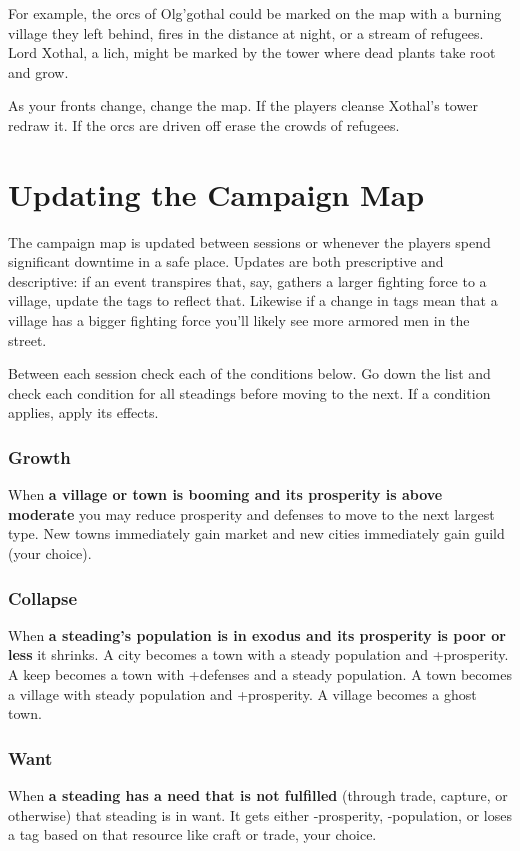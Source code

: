  For example, the orcs of Olg'gothal could be marked on the map with a burning village they left behind, fires in the distance at night, or a stream of refugees. Lord Xothal, a lich, might be marked by the tower where dead plants take root and grow.


 As your fronts change, change the map. If the players cleanse Xothal's tower redraw it. If the orcs are driven off erase the crowds of refugees.
\section*{Updating the Campaign Map}


 The campaign map is updated between sessions or whenever the players spend significant downtime in a safe place. Updates are both prescriptive and descriptive: if an event transpires that, say, gathers a larger fighting force to a village, update the tags to reflect that. Likewise if a change in tags mean that a village has a bigger fighting force you'll likely see more armored men in the street.


 Between each session check each of the conditions below. Go down the list and check each condition for all steadings before moving to the next. If a condition applies, apply its effects.
\subsubsection{Growth}


 When \textbf{a village or town is booming and its prosperity is above moderate}
 you may reduce prosperity and defenses to move to the next largest type. New towns immediately gain market and new cities immediately gain guild (your choice).
\subsubsection{Collapse}


 When \textbf{a steading's population is in exodus and its prosperity is poor or less}
 it shrinks. A city becomes a town with a steady population and +prosperity. A keep becomes a town with +defenses and a steady population. A town becomes a village with steady population and +prosperity. A village becomes a ghost town.
\subsubsection{Want}


 When \textbf{a steading has a need that is not fulfilled}
 (through trade, capture, or otherwise) that steading is in want. It gets either -prosperity, -population, or loses a tag based on that resource like craft or trade, your choice.
